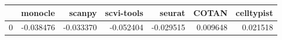 \begin{tabular}{lrrrrrr}
\toprule
 & monocle & scanpy & scvi-tools & seurat & COTAN & celltypist \\
\midrule
0 & -0.038476 & -0.033370 & -0.052404 & -0.029515 & 0.009648 & 0.021518 \\
\bottomrule
\end{tabular}

